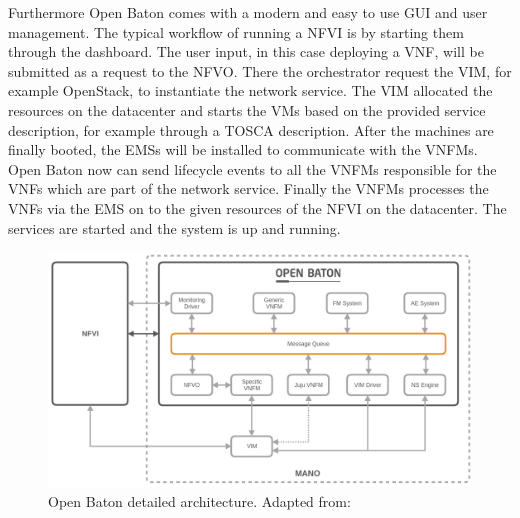 Furthermore Open Baton comes with a modern and easy to use \ac{GUI} and user management.
The typical workflow of running a \ac{NFVI} is by starting them through the dashboard.
The user input, in this case deploying a \ac{VNF}, will be submitted as a request to the \ac{NFVO}.
There the orchestrator request the \ac{VIM}, for example OpenStack, to instantiate the network service.
The \ac{VIM} allocated the resources on the datacenter and starts the \acp{VM} based on the provided service description, for example through a \ac{TOSCA} description.
After the machines are finally booted, the \acp{EMS} will be installed to communicate with the \acp{VNFM}.
Open Baton now can send lifecycle events to all the \acp{VNFM} responsible for the \acp{VNF} which are part of the network service.
Finally the \acp{VNFM} processes the \acp{VNF} via the \ac{EMS} on to the given resources of the \ac{NFVI} on the datacenter.
The services are started and the system is up and running.

\begin{figure}[H]
    \centering
    \includegraphics[width=\textwidth]{resources/images/open_baton_architecture.png}
    \caption[Open Baton detailed architecture]{Open Baton detailed architecture. Adapted from: \autocite{openBatonDoc}}
    \label{fig:open_baton_detailed_architecture}
\end{figure}


